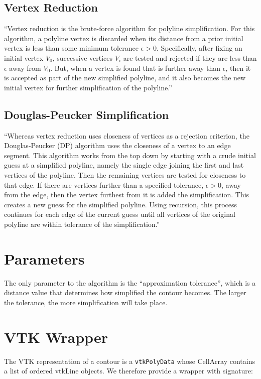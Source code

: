 \documentclass{InsightArticle}
\begin{document}
\subsection{Vertex Reduction}
``Vertex reduction is the brute-force algorithm for polyline simplification.  For this algorithm, a polyline vertex is discarded when its distance from a prior initial vertex is less than some minimum tolerance $\epsilon > 0$.   Specifically,  after fixing an initial vertex $V_0$, successive vertices $V_i$ are tested and rejected if they are less than $\epsilon$ away from $V_0$. But, when a vertex is found that is further away than $\epsilon$, then it is accepted as part of the new simplified polyline, and it also becomes the new initial vertex for further simplification of the polyline.''

\subsection{Douglas-Peucker Simplification}
``Whereas vertex reduction uses closeness of vertices as a rejection criterion, the Douglas-Peucker (DP) algorithm uses the closeness of a vertex to an edge segment.  This algorithm works from the top down by starting with a crude initial guess at a simplified polyline, namely the single edge joining the first and last vertices of the polyline.   Then the remaining vertices are tested for closeness to that edge.  If there are vertices further than a specified tolerance, $\epsilon > 0$, away from the edge, then the vertex furthest from it is added the simplification.  This creates a new guess for the simplified polyline.  Using recursion, this process continues for each edge of the current guess until all vertices of the original polyline are within tolerance of the simplification.''

\section{Parameters}
The only parameter to the algorithm is the ``approximation tolerance'', which is a distance value that determines how simplified the contour becomes. The larger the tolerance, the more simplification will take place.

\section{VTK Wrapper}
The VTK representation of a contour is a \verb|vtkPolyData| whose CellArray contains a list of ordered vtkLine objects. We therefore provide a wrapper with signature:
\end{document}
